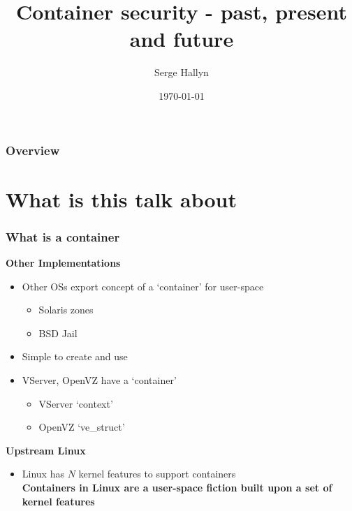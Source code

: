 \documentclass{beamer}
\title[Container Security]{Container security - past, present and future} %
\author{Serge Hallyn} %
\institute[Canonical] %
{
Canonical, Inc \\ %
\medskip
\textit{serge.hallyn@ubuntu.com} %
}
\date{\today} %
\begin{document}
\begin{frame}
\titlepage %
\end{frame}

\begin{frame}
\frametitle{Overview} %
\tableofcontents %
\end{frame}


\section{What is this talk about} %
\begin{frame}
\frametitle{What is a container}
  \pause
\textbf{Other Implementations}
\begin{itemize}
  \item Other OSs export concept of a `container' for user-space
    \begin{itemize}
      \item Solaris zones
      \item BSD Jail
    \end{itemize}
  \item Simple to create and use

  \pause
  \item VServer, OpenVZ have a `container'
    \begin{itemize}
      \item VServer `context'
      \item OpenVZ `ve\_struct'
    \end{itemize}
\end{itemize}

  \vspace{0.15in}
\textbf{Upstream Linux}
\begin{itemize}
  \item Linux has $N$ kernel features to support containers \\
  \vspace{0.15in}
  \pause
  {\bf Containers in Linux are a user-space fiction built upon a set of kernel features}
\end{itemize}

\end{frame}
\end{document}
